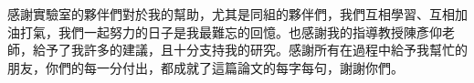 \begin{acknowledgementszh}
感謝實驗室的夥伴們對於我的幫助，尤其是同組的夥伴們，我們互相學習、互相加油打氣，我們一起努力的日子是我最難忘的回憶。也感謝我的指導教授陳彥仰老師，給予了我許多的建議，且十分支持我的研究。感謝所有在過程中給予我幫忙的朋友，你們的每一分付出，都成就了這篇論文的每字每句，謝謝你們。

\end{acknowledgementszh}

